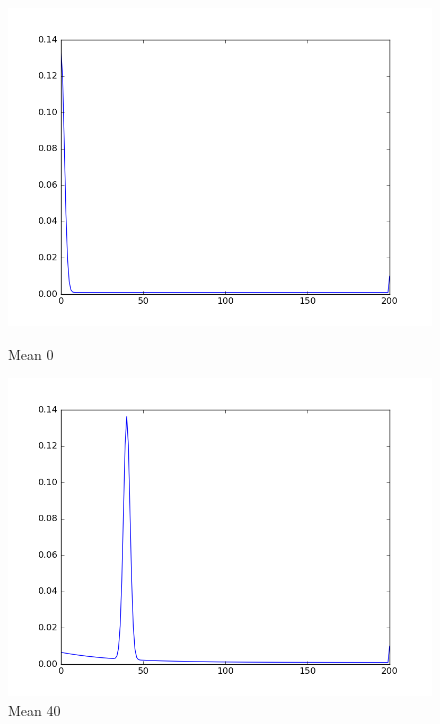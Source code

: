 \documentclass{article}
\begin{document}
\begin{figure}[!hb]
 \centering
 \begin{minipage}[b]{0.4\textwidth}
  \includegraphics[width=\textwidth]{sensor_model_1.png}
  \caption{Mean 0}
 \end{minipage}
 \hfill
 \begin{minipage}[b]{0.4\textwidth}
  \includegraphics[width=\textwidth]{sensor_model_3.png}
  \caption{Mean 40}
 \end{minipage}
 \vfill
 \begin{minipage}[b]{0.4\textwidth}

\end{minipage}
\end{figure}
\end{document}
